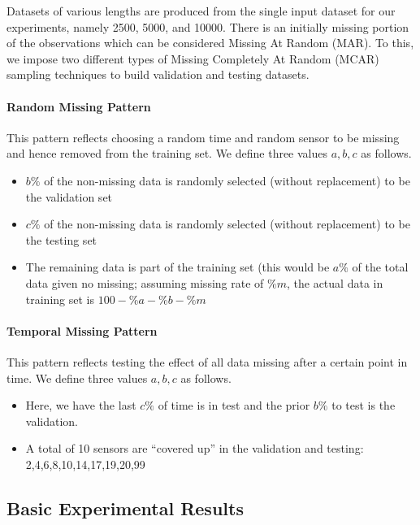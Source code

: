 Datasets of various lengths are produced from the single input dataset for our experiments, namely 2500, 5000, and 10000.
There is an initially missing portion of the observations which can be considered Missing At Random (MAR).
To this, we impose two different types of Missing Completely At Random (MCAR) sampling techniques to build validation and testing datasets.

\paragraph*{Random Missing Pattern}

This pattern reflects choosing a random time and random sensor to be missing and hence removed from the training set.
We define three values $a, b, c$ as follows.

\begin{itemize}
\item $b\%$ of the non-missing data is randomly selected (without replacement) to be the validation set
\item $c\%$ of the non-missing data is randomly selected (without replacement) to be the testing set
\item The remaining data is part of the training set (this would be $a\%$ of the total data given no missing; assuming missing rate of $\%m$, the actual data in training set is $100-\%a-\%b-\%m$
\end{itemize}

\paragraph*{Temporal Missing Pattern}

This pattern reflects testing the effect of all data missing after a certain point in time.
We define three values $a, b, c$ as follows.

\begin{itemize}
\item Here, we have the last $c\%$ of time is in test and the prior $b\%$ to test is the validation.
\item A total of 10 sensors are ``covered up'' in the validation and testing: 2,4,6,8,10,14,17,19,20,99
\end{itemize}

\subsection{Basic Experimental Results} %

